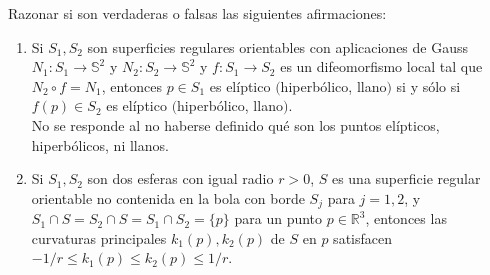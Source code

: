 \documentclass[12pt]{article}
\begin{document}
    \begin{ejercicio}
        Razonar si son verdaderas o falsas las siguientes afirmaciones:

        \begin{enumerate}
            \item[a)] Si $S_1,S_2$ son superficies regulares orientables con aplicaciones de Gauss $N_1:S_1\to \mathbb{S}^2$ y $N_2:S_2\to 
            \mathbb{S}^2$ y $f:S_1\to S_2$ es un difeomorfismo local tal que $N_2\circ f=N_1$, entonces $p\in S_1$ es elíptico $($hiperbólico, 
            llano$)$ si y sólo si $f(p)\in S_2$ es elíptico $($hiperbólico, llano$)$. \\

            No se responde al no haberse definido qué son los puntos elípticos, hiperbólicos, ni llanos.

            \item[b)] Si $S_1,S_2$ son dos esferas con igual radio $r>0$, $S$ es una superficie regular orientable no contenida en la bola 
            con borde $S_j$ para $j=1,2$, y $S_1\cap S=S_2\cap S=S_1\cap S_2=\{p\}$ para un punto $p\in \mathbb{R}^3$, entonces las 
            curvaturas principales $k_1(p),k_2(p)$ de $S$ en $p$ satisfacen $-1/r\leq k_1(p)\leq k_2(p)\leq 1/r$. \\


\end{enumerate}
\end{ejercicio}
\end{document}

